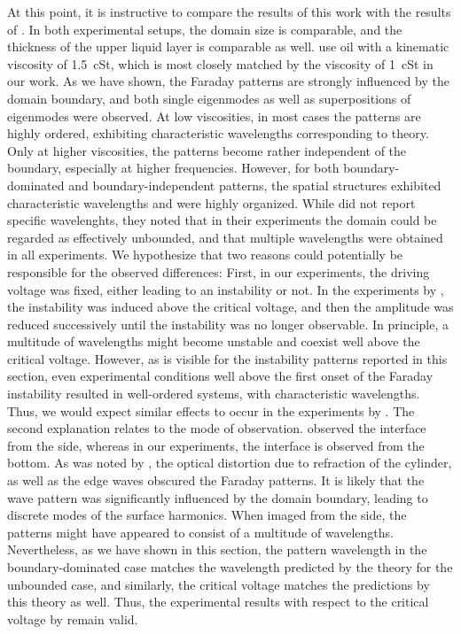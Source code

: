 \documentclass{jfm_arxiv}
\begin{document}
At this point, it is instructive to compare the results of this work with the results of \citet{Ward2019}. In both experimental setups, the domain size is comparable, and the thickness of the upper liquid layer is comparable as well. \citeauthor{Ward2019} use oil with a kinematic viscosity of \SI{1.5}{\centi St}, which is most closely matched by the viscosity of \SI{1}{\centi St} in our work. As we have shown, the Faraday patterns are strongly influenced by the domain boundary, and both single eigenmodes as well as superpositions of eigenmodes were observed. At low viscosities, in most cases the patterns are highly ordered, exhibiting characteristic wavelengths corresponding to theory. Only at higher viscosities, the patterns become rather independent of the boundary, especially at higher frequencies. 
However, for both boundary-dominated and boundary-independent patterns, the spatial structures exhibited characteristic wavelengths and were highly organized.
While \citeauthor{Ward2019} did not report specific wavelenghts, they noted that in their experiments the domain could be regarded as effectively unbounded, and that multiple wavelengths were obtained in all experiments.
We hypothesize that two reasons could potentially be responsible for the observed differences: First, in our experiments, the driving voltage was fixed, either leading to an instability or not. In the experiments by \cite{Ward2019}, the instability was induced above the critical voltage, and then the amplitude was reduced successively until the instability was no longer observable. In principle, a multitude of wavelengths might become unstable and coexist well above the critical voltage.
However, as is visible for the instability patterns reported in this section, even experimental conditions well above the first onset of the Faraday instability resulted in well-ordered systems, with characteristic wavelengths. Thus, we would expect similar effects to occur in the experiments by \citeauthor{Ward2019}.
The second explanation relates to the mode of observation.
\citet{Ward2019} observed the interface from the side, whereas in our experiments, the interface is observed from the bottom. As was noted by \citet{Ward2019}, the optical distortion due to refraction of the cylinder, as well as the edge waves obscured the Faraday patterns.
It is likely that the wave pattern was significantly influenced by the domain boundary, leading to discrete modes of the surface harmonics. When imaged from the side, the patterns might have appeared to consist of a multitude of wavelengths. 
Nevertheless, as we have shown in this section, the pattern wavelength in the boundary-dominated case matches the wavelength predicted by the theory for the unbounded case, and similarly, the critical voltage matches the predictions by this theory as well. Thus, the experimental results with respect to the critical voltage by \citeauthor{Ward2019} remain valid.
\end{document}
